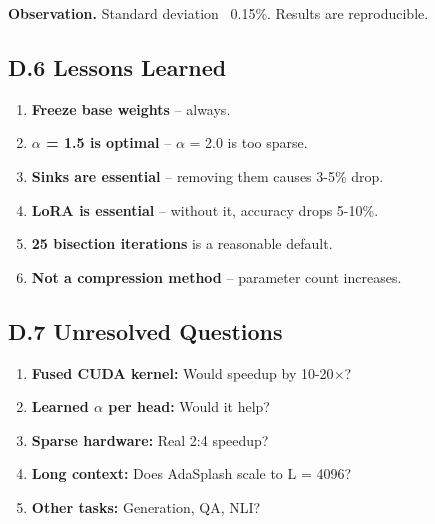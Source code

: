 \textbf{Observation.} Standard deviation ~0.15\%. Results are reproducible.

\subsection{D.6 Lessons Learned}

\begin{enumerate}
\item \textbf{Freeze base weights} -- always.
\item \textbf{$\alpha$ = 1.5 is optimal} -- $\alpha$ = 2.0 is too sparse.
\item \textbf{Sinks are essential} -- removing them causes 3-5\% drop.
\item \textbf{LoRA is essential} -- without it, accuracy drops 5-10\%.
\item \textbf{25 bisection iterations} is a reasonable default.
\item \textbf{Not a compression method} -- parameter count increases.

\end{enumerate}
\subsection{D.7 Unresolved Questions}

\begin{enumerate}
\item \textbf{Fused CUDA kernel:} Would speedup by 10-20$\times$?
\item \textbf{Learned $\alpha$ per head:} Would it help?
\item \textbf{Sparse hardware:} Real 2:4 speedup?
\item \textbf{Long context:} Does AdaSplash scale to L = 4096?
\item \textbf{Other tasks:} Generation, QA, NLI?
\end{enumerate}